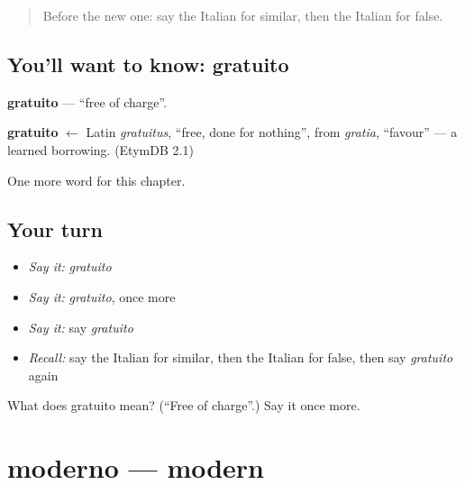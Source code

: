 \label{lesson:IT-C219-gratuito}



\begin{quote}
Before the new one: say the Italian for similar, then the Italian for false.
\end{quote}

\subsection*{You'll want to know: gratuito}
\textbf{gratuito} — \textquotedblleft{}free of charge\textquotedblright{}.

\begin{cousinweb}
\textbf{gratuito} $\leftarrow$ Latin \emph{gratuitus}, \textquotedblleft{}free, done for nothing\textquotedblright{}, from \emph{gratia}, \textquotedblleft{}favour\textquotedblright{} — a learned borrowing. (EtymDB 2.1)
\end{cousinweb}

\begin{grammarlens}[title={What you've built}]
One more word for this chapter.
\end{grammarlens}

\subsection*{Your turn}
\begin{itemize}
\raggedright
  \item \emph{Say it:} \emph{gratuito}
  \item \emph{Say it:} \emph{gratuito}, once more
  \item \emph{Say it:} say \emph{gratuito}
  \item \emph{Recall:} say the Italian for similar, then the Italian for false, then say \emph{gratuito} again
\end{itemize}

\begin{tcolorbox}[breakable,colback=teal!4,colframe=teal!35!black,title={Before you move on}]
What does gratuito mean? (\textquotedblleft{}Free of charge\textquotedblright{}.) Say it once more.
\end{tcolorbox}
\section[moderno]{moderno — modern}

\label{lesson:IT-C219-moderno}



